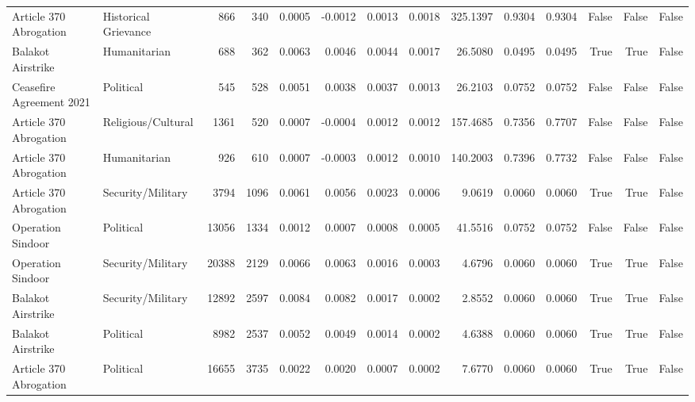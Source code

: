\begin{longtable}{llrrrrrrrrrrrr}
Article 370 Abrogation & Historical Grievance & 866 & 340 & 0.0005 & -0.0012 & 0.0013 & 0.0018 & 325.1397 & 0.9304 & 0.9304 & False & False & False \\
Balakot Airstrike & Humanitarian & 688 & 362 & 0.0063 & 0.0046 & 0.0044 & 0.0017 & 26.5080 & 0.0495 & 0.0495 & True & True & False \\
Ceasefire Agreement 2021 & Political & 545 & 528 & 0.0051 & 0.0038 & 0.0037 & 0.0013 & 26.2103 & 0.0752 & 0.0752 & False & False & False \\
Article 370 Abrogation & Religious/Cultural & 1361 & 520 & 0.0007 & -0.0004 & 0.0012 & 0.0012 & 157.4685 & 0.7356 & 0.7707 & False & False & False \\
Article 370 Abrogation & Humanitarian & 926 & 610 & 0.0007 & -0.0003 & 0.0012 & 0.0010 & 140.2003 & 0.7396 & 0.7732 & False & False & False \\
Article 370 Abrogation & Security/Military & 3794 & 1096 & 0.0061 & 0.0056 & 0.0023 & 0.0006 & 9.0619 & 0.0060 & 0.0060 & True & True & False \\
Operation Sindoor & Political & 13056 & 1334 & 0.0012 & 0.0007 & 0.0008 & 0.0005 & 41.5516 & 0.0752 & 0.0752 & False & False & False \\
Operation Sindoor & Security/Military & 20388 & 2129 & 0.0066 & 0.0063 & 0.0016 & 0.0003 & 4.6796 & 0.0060 & 0.0060 & True & True & False \\
Balakot Airstrike & Security/Military & 12892 & 2597 & 0.0084 & 0.0082 & 0.0017 & 0.0002 & 2.8552 & 0.0060 & 0.0060 & True & True & False \\
Balakot Airstrike & Political & 8982 & 2537 & 0.0052 & 0.0049 & 0.0014 & 0.0002 & 4.6388 & 0.0060 & 0.0060 & True & True & False \\
Article 370 Abrogation & Political & 16655 & 3735 & 0.0022 & 0.0020 & 0.0007 & 0.0002 & 7.6770 & 0.0060 & 0.0060 & True & True & False \\
\end{longtable}
